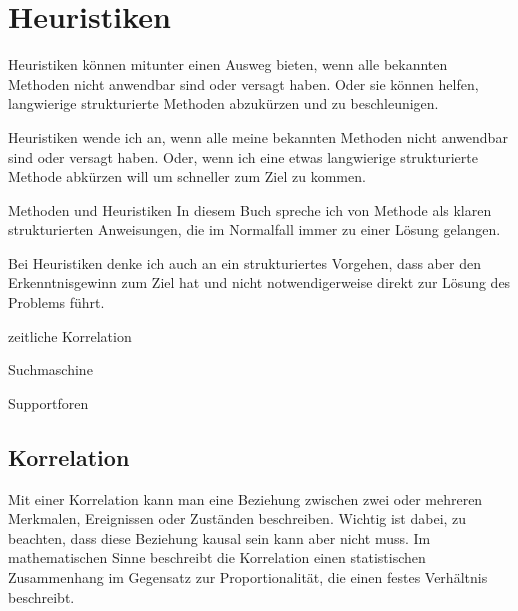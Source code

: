 \chapter{Heuristiken}
\label{cha:heuristiken}

\begin{abstractsec}
  Heuristiken können mitunter einen Ausweg bieten, wenn alle bekannten
  Methoden nicht anwendbar sind oder versagt haben. Oder sie können helfen,
  langwierige strukturierte Methoden abzukürzen und zu beschleunigen.
\end{abstractsec}

\begin{normaltext}
  Heuristiken wende ich an, wenn alle meine bekannten Methoden nicht
  anwendbar sind oder versagt haben. Oder, wenn ich eine etwas langwierige
  strukturierte Methode abkürzen will um schneller zum Ziel zu kommen.

  \begin{Exkursbox}{Methoden und Heuristiken}
    In diesem Buch spreche ich von Methode als klaren strukturierten
    Anweisungen, die im Normalfall immer zu einer Lösung gelangen.

    Bei Heuristiken denke ich auch an ein strukturiertes
    Vorgehen, dass aber den Erkenntnisgewinn zum Ziel hat und nicht
    notwendigerweise direkt zur Lösung des Problems führt.
  \end{Exkursbox}
\end{normaltext}

\begin{notes}
\item zeitliche Korrelation
\item Suchmaschine
\item Supportforen
\end{notes}

\section{Korrelation}
\label{sec:korrelation}


\begin{normaltext}
Mit einer Korrelation kann man eine Beziehung zwischen zwei oder mehreren
Merkmalen, Ereignissen oder Zuständen beschreiben. Wichtig ist dabei, zu
beachten, dass diese Beziehung kausal sein kann aber nicht muss. Im
mathematischen Sinne beschreibt die Korrelation einen statistischen
Zusammenhang im Gegensatz zur Proportionalität, die einen festes Verhältnis
beschreibt.
\end{normaltext}

